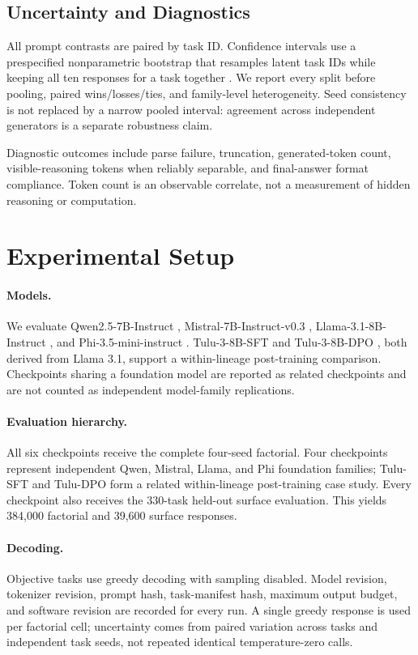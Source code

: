 \documentclass[sigconf]{acmart}
\newcommand{\revision}[1]{\textcolor{revisionred}{#1}}
\begin{document}
\subsection{Uncertainty and Diagnostics}

All prompt contrasts are paired by task ID. \revision{Confidence intervals use
a prespecified nonparametric bootstrap that resamples latent task IDs while
keeping all ten responses for a task together} \cite{efron1979bootstrap}. We
report every split before pooling, paired
wins/losses/ties, and family-level heterogeneity. Seed consistency is not
replaced by a narrow pooled interval: agreement across independent generators
is a separate robustness claim.

Diagnostic outcomes include parse failure, truncation, generated-token count,
visible-reasoning tokens when reliably separable, and final-answer format
compliance. Token count is an observable correlate, not a measurement of
hidden reasoning or computation.

\section{Experimental Setup}

\paragraph{Models.}
\revision{We evaluate Qwen2.5-7B-Instruct \cite{qwen2024qwen25},
Mistral-7B-Instruct-v0.3 \cite{jiang2023mistral},
Llama-3.1-8B-Instruct \cite{dubey2024llama}, and
Phi-3.5-mini-instruct \cite{abdin2024phi3}. Tulu-3-8B-SFT and
Tulu-3-8B-DPO \cite{lambert2024tulu}, both derived from Llama 3.1, support a
within-lineage post-training comparison. Checkpoints sharing a foundation
model are reported as related checkpoints and are not counted as independent
model-family replications.}

\paragraph{Evaluation hierarchy.}
\revision{All six checkpoints receive the complete four-seed factorial. Four
checkpoints represent independent Qwen, Mistral, Llama, and Phi foundation
families; Tulu-SFT and Tulu-DPO form a related within-lineage post-training
case study. Every checkpoint also receives the 330-task held-out surface
evaluation. This yields 384,000 factorial and 39,600 surface responses.}

\paragraph{Decoding.}
Objective tasks use greedy decoding with sampling disabled. Model revision,
tokenizer revision, prompt hash, task-manifest hash, maximum output budget, and
software revision are recorded for every run. A single greedy response is used
per factorial cell; uncertainty comes from paired variation across tasks and
independent task seeds, not repeated identical temperature-zero calls.
\end{document}
